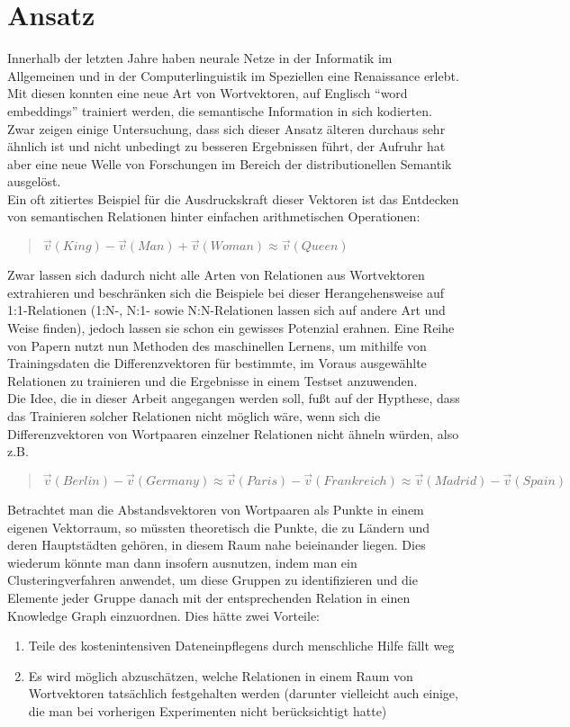 \section{Ansatz}

Innerhalb der letzten Jahre haben neurale Netze in der Informatik im Allgemeinen und in der Computerlinguistik im Speziellen
eine Renaissance erlebt. Mit diesen konnten eine neue Art von Wortvektoren, auf Englisch ``word embeddings'' trainiert werden,
die semantische Information in sich kodierten. Zwar zeigen einige Untersuchung, dass sich dieser Ansatz älteren durchaus sehr
ähnlich ist und nicht unbedingt zu besseren Ergebnissen führt, der Aufruhr hat aber eine neue Welle von Forschungen im Bereich
der distributionellen Semantik ausgelöst.\\
Ein oft zitiertes Beispiel für die Ausdruckskraft dieser Vektoren ist das Entdecken von
semantischen Relationen hinter einfachen arithmetischen Operationen:

\begin{quote}
  $\vec{v}(King) - \vec{v}(Man) + \vec{v}(Woman) \approx \vec{v}(Queen)$
\end{quote}

Zwar lassen sich dadurch nicht alle Arten von Relationen aus Wortvektoren extrahieren und beschränken sich die Beispiele
bei dieser Herangehensweise auf 1:1-Relationen (1:N-, N:1- sowie N:N-Relationen lassen sich auf andere Art und Weise finden),
jedoch lassen sie schon ein gewisses Potenzial erahnen. Eine Reihe von Papern nutzt nun Methoden des maschinellen Lernens,
um mithilfe von Trainingsdaten die Differenzvektoren für bestimmte, im Voraus ausgewählte Relationen zu trainieren und die Ergebnisse
in einem Testset anzuwenden. \\
Die Idee, die in dieser Arbeit angegangen werden soll, fußt auf der Hypthese, dass das Trainieren solcher Relationen nicht
möglich wäre, wenn sich die Differenzvektoren von Wortpaaren einzelner Relationen nicht ähneln würden, also z.B.

\begin{quote}
  $\vec{v}(Berlin) - \vec{v}(Germany) \approx \vec{v}(Paris) - \vec{v}(Frankreich) \approx \vec{v}(Madrid) - \vec{v}(Spain)$
\end{quote}

Betrachtet man die Abstandsvektoren von Wortpaaren als Punkte in einem eigenen Vektorraum, so müssten theoretisch die Punkte,
die zu Ländern und deren Hauptstädten gehören, in diesem Raum nahe beieinander liegen. Dies wiederum könnte man dann insofern
ausnutzen, indem man ein Clusteringverfahren anwendet, um diese Gruppen zu identifizieren und die Elemente jeder Gruppe danach
mit der entsprechenden Relation in einen Knowledge Graph einzuordnen. Dies hätte zwei Vorteile:
\begin{enumerate}
  \item Teile des kostenintensiven Dateneinpflegens durch menschliche Hilfe fällt weg
  \item Es wird möglich abzuschätzen, welche Relationen in einem Raum von Wortvektoren tatsächlich festgehalten werden
        (darunter vielleicht auch einige, die man bei vorherigen Experimenten nicht berücksichtigt hatte)
\end{enumerate}

